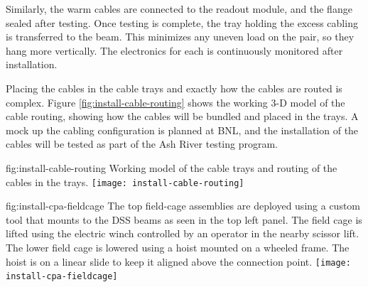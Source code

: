 Similarly, the  warm cables are connected to the readout module, and the flange sealed after testing.  Once testing is complete, the tray holding the excess cabling is transferred to the  beam.  This minimizes any uneven load on the  pair, so they hang more vertically.   
The electronics for each  is continuously monitored after installation. 

Placing the cables in the cable trays and exactly how the cables are routed is complex. Figure \ref{fig:install-cable-routing} shows the working 3-D model of the cable routing, showing how the cables will be bundled and placed in the trays. A mock up the cabling configuration is planned at BNL, and the installation of the cables will be tested as part of the Ash River testing program.

\begin{dunefigure}{fig:install-cable-routing}
  {Working model of the cable trays and routing of the cables in the trays.}
\texttt{[image: install-cable-routing]}
\end{dunefigure}


\begin{dunefigure}{fig:install-cpa-fieldcage}
  {The top field-cage assemblies are deployed using a custom tool that mounts to the DSS beams as seen in the top left panel. The field cage is lifted using the electric winch controlled by an operator in the nearby scissor lift. The lower field cage is lowered using a hoist mounted on a wheeled frame. The hoist is on a linear slide to keep it aligned above the connection point.}
\texttt{[image: install-cpa-fieldcage]}
\end{dunefigure}

